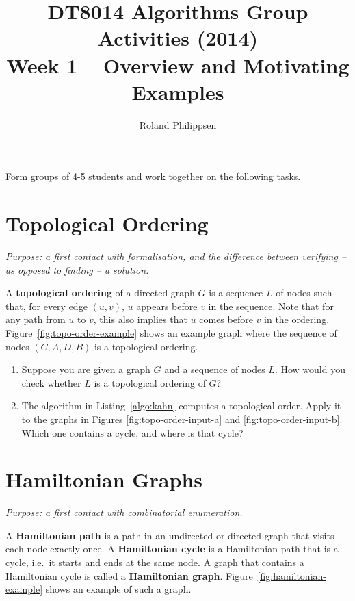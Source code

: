 \documentclass[a4paper]{article}
\begin{document}
\title{
  \large
  DT8014 Algorithms Group Activities (2014)\\
  \Large
  Week 1 -- Overview and Motivating Examples}
\author{Roland Philippsen}
\maketitle



\noindent
Form groups of 4-5 students and work together on the following tasks.



\section*{Topological Ordering}

\emph{Purpose: a first contact with formalisation, and the difference between verifying -- as opposed to finding -- a solution.}

A \textbf{topological ordering} of a directed graph $G$ is a sequence $L$ of nodes such that, for every edge $(u,v)$, $u$ appears before $v$ in the sequence.
Note that for any path from $u$ to $v$, this also implies that $u$ comes before $v$ in the ordering.
Figure~\ref{fig:topo-order-example} shows an example graph where the sequence of nodes $(C,A,D,B)$ is a topological ordering.

\begin{enumerate}
  
\item
  Suppose you are given a graph $G$ and a sequence of nodes $L$.
  How would you check whether $L$ is a topological ordering of $G$?
  
\item
  The algorithm in Listing~\ref{algo:kahn} computes a topological order.
  Apply it to the graphs in Figures \ref{fig:topo-order-input-a} and \ref{fig:topo-order-input-b}.
  Which one contains a cycle, and where is that cycle?
\end{enumerate}



\section*{Hamiltonian Graphs}

\emph{Purpose: a first contact with combinatorial enumeration.}

A \textbf{Hamiltonian path} is a path in an undirected or directed graph that visits each node exactly once.
A \textbf{Hamiltonian cycle} is a Hamiltonian path that is a cycle, i.e.\ it starts and ends at the same node.
A graph that contains a Hamiltonian cycle is called a \textbf{Hamiltonian graph}.
Figure~\ref{fig:hamiltonian-example} shows an example of such a graph.
\end{document}
